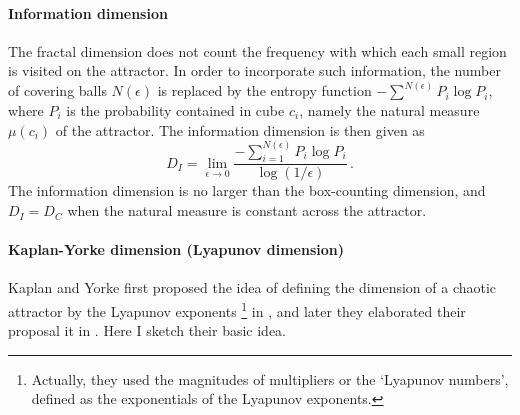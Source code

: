 \paragraph{Information dimension}
The fractal dimension does not count the frequency with which each small region
is visited on the attractor. In order to incorporate such information,
the number of covering balls $N(\epsilon)$ is replaced by the entropy
function $-\sum^{N(\epsilon)} P_i \log P_i$, where $P_{i}$ is the probability
contained in cube $c_i$, namely the natural measure $\mu(c_i)$
of the attractor. The information dimension is then given as
\begin{equation}
  \label{eq:di}
  D_I = \lim_{\epsilon \to 0} \frac{-\displaystyle \sum^{N(\epsilon)}_{i=1}
    P_{i} \log P_i}{\log(1/\epsilon)}
  \,.
\end{equation}
The information dimension is no larger than the box-counting dimension, and
$D_I = D_C$ when the natural measure is constant across the attractor.

\paragraph{Kaplan-Yorke dimension (Lyapunov dimension)}
Kaplan and Yorke first proposed the idea of defining the dimension of a
chaotic attractor by the Lyapunov exponents
    \footnote{Actually, they used the magnitudes of
    multipliers or the `Lyapunov numbers', defined as the exponentials of
    the Lyapunov exponents. }
in , and later they elaborated their proposal it in .
Here I sketch their basic idea.

